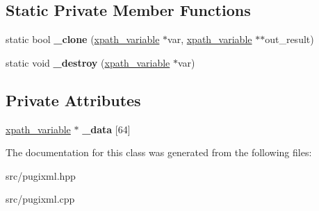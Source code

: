 \subsection*{Static Private Member Functions}
\begin{DoxyCompactItemize}
\item 
\mbox{\label{classpugi_1_1xpath__variable__set_a92eab7f44b95427827e255987fb0b199}} 
static bool {\bfseries \+\_\+clone} (\hyperlink{classpugi_1_1xpath__variable}{xpath\+\_\+variable} $\ast$var, \hyperlink{classpugi_1_1xpath__variable}{xpath\+\_\+variable} $\ast$$\ast$out\+\_\+result)
\item 
\mbox{\label{classpugi_1_1xpath__variable__set_a8f211a74309b7d434b5ce708147a240a}} 
static void {\bfseries \+\_\+destroy} (\hyperlink{classpugi_1_1xpath__variable}{xpath\+\_\+variable} $\ast$var)
\end{DoxyCompactItemize}
\subsection*{Private Attributes}
\begin{DoxyCompactItemize}
\item 
\mbox{\label{classpugi_1_1xpath__variable__set_acdc8e00090e1474c3dcbe6f1603ba986}} 
\hyperlink{classpugi_1_1xpath__variable}{xpath\+\_\+variable} $\ast$ {\bfseries \+\_\+data} \mbox{[}64\mbox{]}
\end{DoxyCompactItemize}


The documentation for this class was generated from the following files\+:\begin{DoxyCompactItemize}
\item 
src/pugixml.\+hpp\item 
src/pugixml.\+cpp\end{DoxyCompactItemize}
